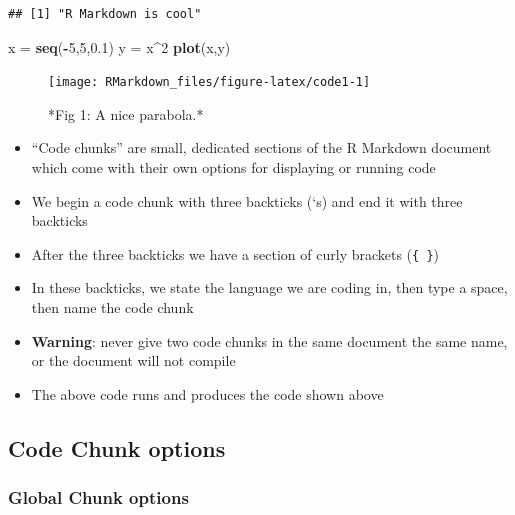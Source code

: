 \documentclass[]{article}
\newenvironment{Shaded}{\begin{snugshade}}{\end{snugshade}}
\newcommand{\DecValTok}[1]{\textcolor[rgb]{0.00,0.00,0.81}{#1}}
\newcommand{\FloatTok}[1]{\textcolor[rgb]{0.00,0.00,0.81}{#1}}
\newcommand{\KeywordTok}[1]{\textcolor[rgb]{0.13,0.29,0.53}{\textbf{#1}}}
\newcommand{\NormalTok}[1]{#1}
\newcommand{\OperatorTok}[1]{\textcolor[rgb]{0.81,0.36,0.00}{\textbf{#1}}}
\newcommand{\StringTok}[1]{\textcolor[rgb]{0.31,0.60,0.02}{#1}}
\providecommand{\tightlist}{%
  \setlength{\itemsep}{0pt}\setlength{\parskip}{0pt}}
\begin{document}
\begin{verbatim}
## [1] "R Markdown is cool"
\end{verbatim}

\begin{Shaded}
\begin{Highlighting}[]
\NormalTok{x =}\StringTok{ }\KeywordTok{seq}\NormalTok{(}\OperatorTok{-}\DecValTok{5}\NormalTok{,}\DecValTok{5}\NormalTok{,}\FloatTok{0.1}\NormalTok{)}
\NormalTok{y =}\StringTok{ }\NormalTok{x}\OperatorTok{^}\DecValTok{2}
\KeywordTok{plot}\NormalTok{(x,y)}
\end{Highlighting}
\end{Shaded}

\begin{figure}

{\centering \texttt{[image: RMarkdown\_files/figure-latex/code1-1]} 

}

\caption{*Fig 1: A nice parabola.*}\label{fig:code1}
\end{figure}

\begin{itemize}
\tightlist
\item
  ``Code chunks'' are small, dedicated sections of the R Markdown
  document which come with their own options for displaying or running
  code
\item
  We begin a code chunk with three backticks (`s) and end it with three
  backticks
\item
  After the three backticks we have a section of curly brackets
  (\texttt{\{\ \}})
\item
  In these backticks, we state the language we are coding in, then type
  a space, then name the code chunk
\item
  \textbf{Warning}: never give two code chunks in the same document the
  same name, or the document will not compile
\end{itemize}

\begin{itemize}
\tightlist
\item
  The above code runs and produces the code shown above
\end{itemize}

\hypertarget{code-chunk-options}{%
\subsection{Code Chunk options}\label{code-chunk-options}}

\hypertarget{global-chunk-options}{%
\subsubsection{Global Chunk options}\label{global-chunk-options}}
\end{document}
